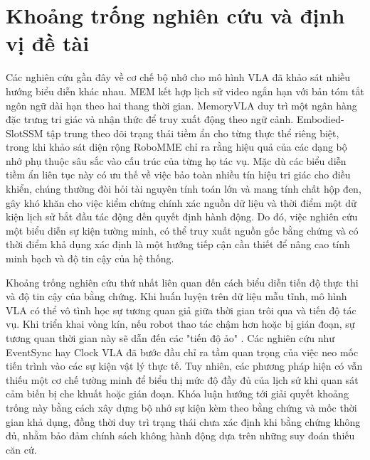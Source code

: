 \section{Khoảng trống nghiên cứu và định vị đề tài}

Các nghiên cứu gần đây về cơ chế bộ nhớ cho mô hình VLA đã khảo sát nhiều hướng biểu diễn khác nhau. MEM \cite{mem2026} kết hợp lịch sử video ngắn hạn với bản tóm tắt ngôn ngữ dài hạn theo hai thang thời gian. MemoryVLA \cite{memoryvla2026} duy trì một ngân hàng đặc trưng tri giác và nhận thức để truy xuất động theo ngữ cảnh. Embodied-SlotSSM \cite{liberomem2025} tập trung theo dõi trạng thái tiềm ẩn cho từng thực thể riêng biệt, trong khi khảo sát diện rộng RoboMME \cite{robomme2026} chỉ ra rằng hiệu quả của các dạng bộ nhớ phụ thuộc sâu sắc vào cấu trúc của từng họ tác vụ. Mặc dù các biểu diễn tiềm ẩn liên tục này có ưu thế về việc bảo toàn nhiều tín hiệu tri giác cho điều khiển, chúng thường đòi hỏi tài nguyên tính toán lớn và mang tính chất hộp đen, gây khó khăn cho việc kiểm chứng chính xác nguồn dữ liệu và thời điểm một dữ kiện lịch sử bắt đầu tác động đến quyết định hành động. Do đó, việc nghiên cứu một biểu diễn sự kiện tường minh, có thể truy xuất nguồn gốc bằng chứng và có thời điểm khả dụng xác định là một hướng tiếp cận cần thiết để nâng cao tính minh bạch và độ tin cậy của hệ thống.

Khoảng trống nghiên cứu thứ nhất liên quan đến cách biểu diễn tiến độ thực thi và độ tin cậy của bằng chứng. Khi huấn luyện trên dữ liệu mẫu tĩnh, mô hình VLA có thể vô tình học sự tương quan giả giữa thời gian trôi qua và tiến độ tác vụ. Khi triển khai vòng kín, nếu robot thao tác chậm hơn hoặc bị gián đoạn, sự tương quan thời gian này sẽ dẫn đến các "tiến độ ảo" \cite{clockvla2026}. Các nghiên cứu như EventSync \cite{eventsync2026} hay Clock VLA \cite{clockvla2026} đã bước đầu chỉ ra tầm quan trọng của việc neo mốc tiến trình vào các sự kiện vật lý thực tế. Tuy nhiên, các phương pháp hiện có vẫn thiếu một cơ chế tường minh để biểu thị mức độ đầy đủ của lịch sử khi quan sát cảm biến bị che khuất hoặc gián đoạn. Khóa luận hướng tới giải quyết khoảng trống này bằng cách xây dựng bộ nhớ sự kiện kèm theo bằng chứng và mốc thời gian khả dụng, đồng thời duy trì trạng thái chưa xác định khi bằng chứng không đủ, nhằm bảo đảm chính sách không hành động dựa trên những suy đoán thiếu căn cứ.

